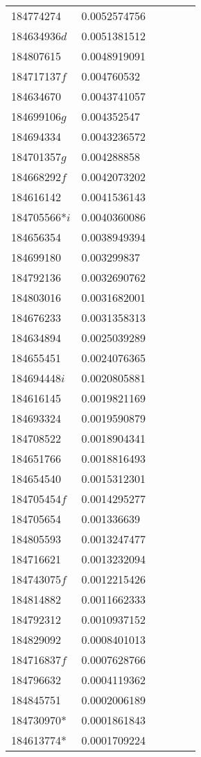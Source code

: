 \begin{landscape}
\begin{longtable}{p{1.8cm}p{2cm}p{2.2cm}p{1cm}p{2.8cm}p{12.3cm}}
184774274&0.0052574756&&&& \\
184634936$d$&0.0051381512&&&& \\
184807615&0.0048919091&&&& \\
184717137$f$&0.004760532&&&& \\
184634670&0.0043741057&&&& \\
184699106$g$&0.004352547&&&& \\
184694334&0.0043236572&&&& \\
184701357$g$&0.004288858&&&& \\
184668292$f$&0.0042073202&&&& \\
184616142&0.0041536143&&&& \\
184705566*$i$&0.0040360086&&&& \\
184656354&0.0038949394&&&& \\
184699180&0.003299837&&&& \\
184792136&0.0032690762&&&& \\
184803016&0.0031682001&&&& \\
184676233&0.0031358313&&&& \\
184634894&0.0025039289&&&& \\
184655451&0.0024076365&&&& \\
184694448$i$&0.0020805881&&&& \\
184616145&0.0019821169&&&& \\
184693324&0.0019590879&&&& \\
184708522&0.0018904341&&&& \\
184651766&0.0018816493&&&& \\
184654540&0.0015312301&&&& \\
184705454$f$&0.0014295277&&&& \\
184705654&0.001336639&&&& \\
184805593&0.0013247477&&&& \\
184716621&0.0013232094&&&& \\
184743075$f$&0.0012215426&&&& \\
184814882&0.0011662333&&&& \\
184792312&0.0010937152&&&& \\
184829092&0.0008401013&&&& \\
184716837$f$&0.0007628766&&&& \\
184796632&0.0004119362&&&& \\
184845751&0.0002006189&&&& \\
184730970*&0.0001861843&&&& \\
184613774*&0.0001709224&&&& \\
\end{longtable}
\endgroup
\end{landscape}
